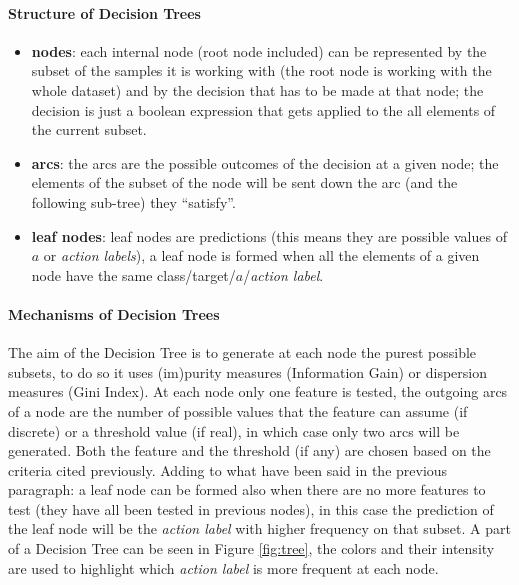\paragraph{Structure of Decision Trees}
\begin{itemize}
 \item \textbf{nodes}: each internal node (root node included) can be represented by the subset of the samples it is working with (the root node is working with the whole dataset) and by the decision that has to be made at that node; the decision is just a boolean expression that gets applied to the all elements of the current subset. 
 \item \textbf{arcs}: the arcs are the possible outcomes of the decision at a given node; the elements of the subset of the node will be sent down the arc (and the following sub-tree) they ``satisfy''.
 \item \textbf{leaf nodes}: leaf nodes are predictions (this means they are possible values of $a$ or \textit{action labels}), a leaf node is formed when all the elements of a given node have the same class/target/$a$/\textit{action label}.
\end{itemize}

\paragraph{Mechanisms of Decision Trees}
The aim of the Decision Tree is to generate at each node the purest possible subsets, to do so it uses (im)purity measures (Information Gain) or dispersion measures (Gini Index). At each node only one feature is tested, the outgoing arcs of a node are the number of possible values that the feature can assume (if discrete) or a threshold value (if real), in which case only two arcs will be generated. Both the feature and the threshold (if any) are chosen based on the criteria cited previously. Adding to what have been said in the previous paragraph: a leaf node can be formed also when there are no more features to test (they have all been tested in previous nodes), in this case the prediction of the leaf node will be the \textit{action label} with higher frequency on that subset. A part of a Decision Tree can be seen in Figure \ref{fig:tree}, the colors and their intensity are used to highlight which \textit{action label} is more frequent at each node.

